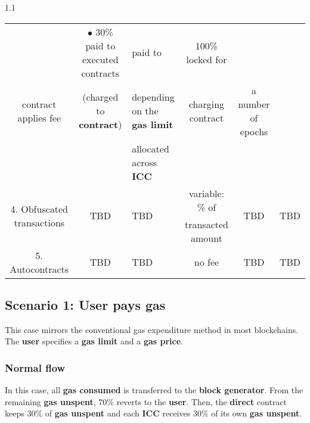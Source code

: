 \documentclass[twocolumn, nofootinbib]{revtex4-2} %
\newcommand{\emphasize}[1]{\textbf{#1}\xspace}
\newcommand{\blockgenerator}{\emphasize{block generator}}
\newcommand{\contract}{\emphasize{contract}}
\newcommand{\direct}{\emphasize{direct}}
\newcommand{\gasprice}{\emphasize{gas price}}
\newcommand{\gaslimit}{\emphasize{gas limit}}
\newcommand{\gasconsumed}{\emphasize{gas consumed}}
\newcommand{\gasunspent}{\emphasize{gas unspent}}
\newcommand{\icc}{\emphasize{ICC}}
\newcommand{\user}{\emphasize{user}}
\begin{document}
\begin{table*}[t]
\begin{spacing}{1.1}
{\begin{tabular}{| c | c | l | c | c | c |}
					& $\bullet$ 30\% paid to executed contracts
					& paid to
					& 100\% locked for
					&
					\\
					contract applies fee
					& (charged to \contract)
					& \hspace{0.2cm} depending on the \gaslimit
					& charging contract
					& a number of epochs
					&
					\\
					&
					& \hspace{0.2cm} allocated across \icc
					&
					&
					&
					\\ \hline
					\multirow{2}{*}{4. Obfuscated transactions}
					& \multirow{2}{*}{TBD}
					& \multirow{2}{*}{TBD}
					& variable: \% of
					& \multirow{2}{*}{TBD}
					& \multirow{2}{*}{TBD}
					\\

					&
					&
					& transacted amount
					&
					&
					\\
					\hline
					5. Autocontracts
					& TBD
					& TBD
					& no fee
					& TBD
					& TBD
					\\
					\hline
				\end{tabular}
			}
			\caption{Summary of how gas and fees are handled in each scenario.}
			\label{tab:gas}
		\end{spacing}
	\end{table*}

    \subsection{Scenario 1: User pays gas}\label{sec:specifications:scenario-1}
    This case mirrors the conventional gas expenditure method in most
    blockchains.
    The \user specifies a \gaslimit and a \gasprice.

    \subsubsection{Normal flow}\label{sec:specifications:scenario-1:normal-flow}

    In this case, all \gasconsumed is transferred to the \blockgenerator. From the remaining \gasunspent, 70\% reverts to the \user. Then, the \direct contract keeps 30\% of \gasunspent and each \icc receives 30\% of its own \gasunspent.
\end{document}
